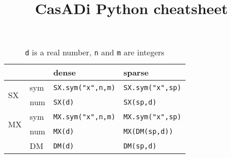 \documentclass[a4paper,8pt]{article}
\begin{document}
\title{CasADi Python cheatsheet}
\date{}
\maketitle

\begin{table}[ht]
\centering
\begin{tabular}{ll|ll}
 & & dense & sparse \\
\hline
\multirow{2}{*}{SX} & sym & \verb|SX.sym("x",n,m)|  & \verb|SX.sym("x",sp)| \\ 
    & num & \verb|SX(d)|   & \verb|SX(sp,d)| \\
\hline
\multirow{2}{*}{MX} & sym &  \verb|MX.sym("x",n,m)|  & \verb|MX.sym("x",sp)|\\
    & num & \verb|MX(d)| &  \verb|MX(DM(sp,d))| \\
\hline
    & DM &  \verb|DM(d)|  & \verb|DM(sp,d)| \\
\end{tabular}

\caption{\texttt{d} is a real number, \texttt{n} and \texttt{m} are integers }
\label{tab:constr}
\end{table}
\end{document}
